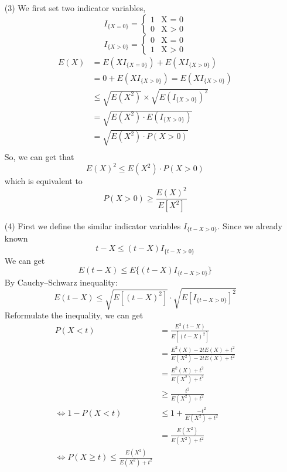 \documentclass[a4paper,12pt]{article}
\begin{document}
\begin{enumerate}
\begin{itemize}
\clearpage
\item[(3)]
We first set two indicator variables,
$$
I_{ \{X=0\} } =
\begin{cases}
1& \text{X = 0}\\
0& \text{X $>$ 0}
\end{cases}
$$
$$
I_{ \{X>0\} } =
\begin{cases}
0& \text{X = 0}\\
1& \text{X $>$ 0}
\end{cases}
$$
\begin{align*}
E(X) &= E(X I_{ \{X=0\} } ) + E(X I_{ \{X>0\} }) \\
	 &= 0 + E(X I_{ \{X>0\} }) = E(X I_{ \{X>0\} }) \\
	 &\le \sqrt{E(X^2)} \times \sqrt{E (I_{ \{X>0\} })^2} \\
	 &=\sqrt{E(X^2) \cdot E (I_{ \{X>0\} })} \\
	 &= \sqrt{E(X^2) \cdot P(X>0)} \\
\end{align*}
So, we can get that
$$
E(X)^2 \le E(X^2) \cdot P(X>0)
$$
which is equivalent to 
$$
 P(X>0) \ge \frac{E(X)^2}{ E[X^2]}
$$
\clearpage
\item[(4)]
First we define the similar  indicator variables $I_{ \{t - X > 0\} }$. Since we already known
$$
t - X \le (t-X) I_{ \{t - X > 0\} }
$$
We can get 
$$
E(t - X) \le E \{ (t-X) I_{ \{t - X > 0\} } \}
$$
By Cauchy–Schwarz inequality:
$$
E(t - X) \le \sqrt{E[(t-X)^2]} \cdot \sqrt{E[ I_{ \{t - X > 0\} }]^2}
$$
Reformulate the inequality, we can get
\begin{align*}
P (X < t) &= \frac{E^2(t - X)}{E[(t-X)^2]} \\
		   &= \frac{E^2(X) - 2t E(X) + t^2}{E(X^2) - 2t E(X) + t^2} \\
		   &= \frac{E^2(X) + t^2}{E(X^2) + t^2} \\
		   &\ge \frac{t^2}{E(X^2) + t^2} \\
\Longleftrightarrow 1 - P (X < t) &\le 1 + \frac{-t^2}{E(X^2) + t^2} \\
			&=\frac{E(X^2)}{E(X^2) + t^2} \\ 
\Longleftrightarrow P (X \ge t) \le \frac{E(X^2)}{E(X^2) + t^2} 
\end{align*}

\end{itemize}

\clearpage



\end{enumerate}
\end{document}
